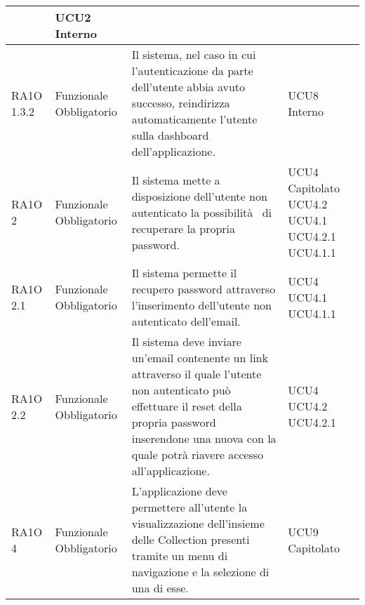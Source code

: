 \begin{center}
\begin{longtable}{ | l | p{2cm} | p{5cm} | p{1.7cm} |}
 &  UCU2 \newline  Interno \newline  \\ \hline      
        RA1O 1.3.2 & Funzionale \newline  Obbligatorio  & Il sistema, nel caso in cui l'autenticazione da parte dell'utente abbia avuto successo, reindirizza automaticamente l'utente sulla dashboard dell'applicazione.
 &  UCU8 \newline  Interno \newline  \\ \hline      
        RA1O 2  & Funzionale \newline  Obbligatorio  & Il sistema mette a disposizione dell'utente non autenticato la possibilità  di recuperare la propria password. &  UCU4 \newline  Capitolato \newline  UCU4.2 \newline  UCU4.1 \newline  UCU4.2.1 \newline  UCU4.1.1 \newline  \\ \hline      
        RA1O 2.1 & Funzionale \newline  Obbligatorio  & Il sistema permette il recupero password attraverso l'inserimento dell'utente non autenticato dell'email.
 &  UCU4 \newline  UCU4.1 \newline  UCU4.1.1 \newline  \\ \hline      
        RA1O 2.2 & Funzionale \newline  Obbligatorio  & Il sistema deve inviare un'email contenente un link attraverso il quale l'utente non autenticato può effettuare il reset della propria password inserendone una nuova con la quale potrà riavere accesso all'applicazione. &  UCU4 \newline  UCU4.2 \newline  UCU4.2.1 \newline  \\ \hline      
        RA1O 4 & Funzionale \newline  Obbligatorio  & L'applicazione deve permettere all'utente la visualizzazione dell'insieme delle Collection presenti tramite un menu di navigazione e la selezione di una di esse. &  UCU9 \newline  Capitolato \newline  \\ \hline      

\end{longtable}
\end{center}
